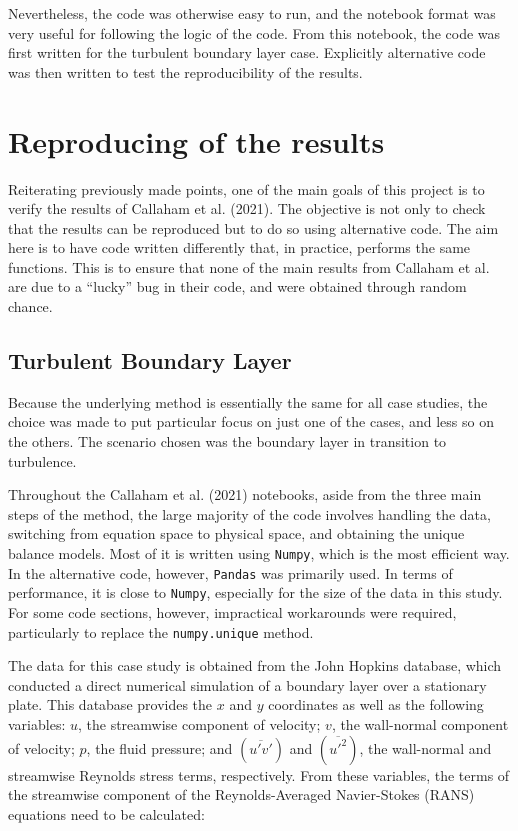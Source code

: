 \documentclass[12pt]{report} %
\begin{document}
Nevertheless, the code was otherwise easy to run, and the notebook format was very useful for following the logic of the code. From this notebook, the code was first written for the turbulent boundary layer case. Explicitly alternative code was then written to test the reproducibility of the results.

\section{Reproducing of the results}

Reiterating previously made points, one of the main goals of this project is to verify the results of Callaham et al. (2021)\cite{callaham2021learning}. The objective is not only to check that the results can be reproduced but to do so using alternative code. The aim here is to have code written differently that, in practice, performs the same functions. This is to ensure that none of the main results from Callaham et al. are due to a “lucky” bug in their code, and were obtained through random chance.

\subsection{Turbulent Boundary Layer}

Because the underlying method is essentially the same for all case studies, the choice was made to put particular focus on just one of the cases, and less so on the others. The scenario chosen was the boundary layer in transition to turbulence.

Throughout the Callaham et al. (2021)\cite{callaham2021learning} notebooks, aside from the three main steps of the method, the large majority of the code involves handling the data, switching from equation space to physical space, and obtaining the unique balance models. Most of it is written using \texttt{Numpy}, which is the most efficient way. In the alternative code, however, \texttt{Pandas} was primarily used. In terms of performance, it is close to \texttt{Numpy}, especially for the size of the data in this study. For some code sections, however, impractical workarounds were required, particularly to replace the \texttt{numpy.unique} method.

The data for this case study is obtained from the John Hopkins database, which conducted a direct numerical simulation of a boundary layer over a stationary plate\cite{jhtdb}. This database provides the $x$ and $y$ coordinates as well as the following variables: $u$, the streamwise component of velocity;  $v$, the wall-normal component of velocity;  $p$, the fluid pressure; and $(\overline{u{\prime} v{\prime}})$ and $(\overline{u{\prime}^2})$, the wall-normal and streamwise Reynolds stress terms, respectively. From these variables, the terms of the streamwise component of the Reynolds-Averaged Navier-Stokes (RANS) equations need to be calculated:
\end{document}
